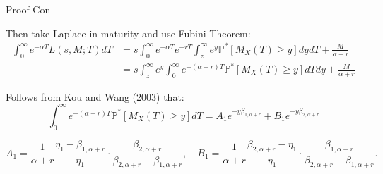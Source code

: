 \documentclass{beamer}
\begin{document}
\begin{frame}{Proof Con}

    {\footnotesize \footnotesize
    \par Then take Laplace in maturity and use Fubini Theorem:
    \begin{align*}
      \int_{0}^{\infty} e^{-\alpha T} L(s, M; T) dT 
    &= s \int_{0}^{\infty} e^{-\alpha T} e^{-rT} \int_{z}^{\infty} e^{y} \mathbb{P}^*[M_X(T) \geq y] dy dT + \frac{M}{\alpha + r} \\
    &= s \int_{z}^{\infty} e^{y} \int_{0}^{\infty} e^{-(\alpha + r)T} \mathbb{P}^*[M_X(T) \geq y] dT dy + \frac{M}{\alpha + r}
    \end{align*}
    
    \par Follows from Kou and Wang (2003) that:
    \[
    \int_{0}^{\infty} e^{-(\alpha + r)T} \mathbb{P}^*[M_X(T) \geq y] dT = A_1 e^{-y\beta_{1,\alpha+r}} + B_1 e^{-y\beta_{2,\alpha+r}}
    \]

    \[
    A_1 = \frac{1}{\alpha + r} \frac{\eta_1 - \beta_{1,\alpha+r}}{\eta_1} \cdot \frac{\beta_{2,\alpha+r}}{\beta_{2,\alpha+r} - \beta_{1,\alpha+r}}, \quad
    B_1 = \frac{1}{\alpha + r} \frac{\beta_{2,\alpha+r} - \eta_1}{\eta_1} \cdot \frac{\beta_{1,\alpha+r}}{\beta_{2,\alpha+r} - \beta_{1,\alpha+r}}.
    \]
    }
    
\end{frame}
\end{document}
